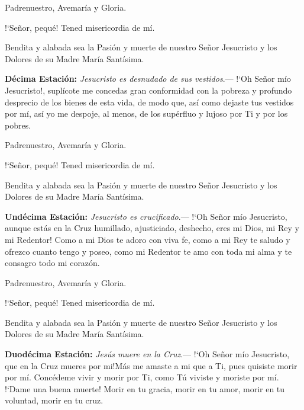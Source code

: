 \vspace{2mm}

Padrenuestro, Avemaría y Gloria.

{!`}Señor, pequé! Tened misericordia de mí.

Bendita y alabada sea la Pasión y muerte de nuestro Señor Jesucristo y los Dolores de su Madre María Santísima.

\vspace{2mm}

\textbf{Décima Estación:} \textit{Jesucristo es desnudado de sus vestidos}.--- {!`}Oh Señor mío Jesucristo!, suplícote me concedas gran conformidad con la pobreza y profundo desprecio de los
bienes de esta vida, de modo que, así como dejaste tus vestidos por mí, así yo me despoje, al menos, de los supérfluo y lujoso por Ti y por los pobres.

\vspace{2mm}

Padrenuestro, Avemaría y Gloria.

{!`}Señor, pequé! Tened misericordia de mí.

Bendita y alabada sea la Pasión y muerte de nuestro Señor Jesucristo y los Dolores de su Madre María Santísima.

\vspace{2mm}

\textbf{Undécima Estación:} \textit{Jesucristo es crucificado}.--- {!`}Oh Señor mío Jesucristo, aunque estás en la Cruz humillado, ajusticiado, deshecho, eres mi Dios, mi Rey y mi Redentor!
Como a mi Dios te adoro con viva fe, como a mi Rey te saludo y ofrezco cuanto tengo y poseo, como mi Redentor te amo con toda mi alma y te consagro todo mi corazón. 

\vspace{2mm}

Padrenuestro, Avemaría y Gloria.

{!`}Señor, pequé! Tened misericordia de mí.

Bendita y alabada sea la Pasión y muerte de nuestro Señor Jesucristo y los Dolores de su Madre María Santísima.

\vspace{2mm}

\textbf{Duodécima Estación:} \textit{Jesús muere en la Cruz}.--- {!`}Oh Señor mío Jesucristo, que en la Cruz mueres por mi!Más me amaste a mi que a Ti, pues quisiste morir por mí.
Concédeme vivir y morir por Ti, como Tú viviste y moriste por mí. {!`}Dame una buena muerte! Morir en tu gracia, morir en tu amor, morir en tu voluntad, morir en tu cruz.

